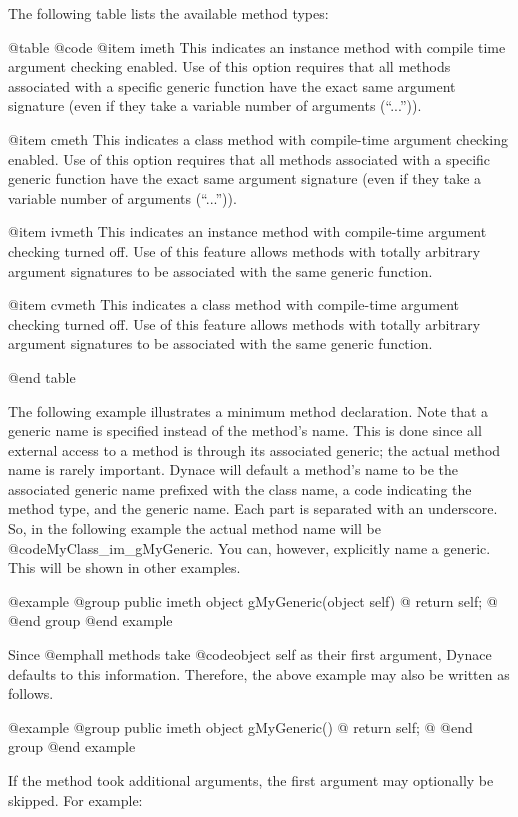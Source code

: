 The following table lists the available method types:

@table @code
@item imeth
This indicates an instance method with compile time argument checking
enabled.  Use of this option requires that all methods associated
with a specific generic function have the exact same argument
signature (even if they take a variable number of arguments (``...'')).

@item cmeth
This indicates a class method with compile-time argument checking
enabled.  Use of this option requires that all methods associated with
a specific generic function have the exact same argument signature
(even if they take a variable number of arguments (``...'')).

@item ivmeth
This indicates an instance method with compile-time argument checking
turned off.  Use of this feature allows methods with totally arbitrary
argument signatures to be associated with the same generic function.

@item cvmeth
This indicates a class method with compile-time argument checking
turned off.  Use of this feature allows methods with totally arbitrary
argument signatures to be associated with the same generic function.


@end table

The following example illustrates a minimum method declaration.  Note
that a generic name is specified instead of the method's name.  This is
done since all external access to a method is through its associated
generic; the actual method name is rarely important.  Dynace will
default a method's name to be the associated generic name prefixed with
the class name, a code indicating the method type, and the generic name.
Each part is separated with an underscore.  So, in the following example
the actual method name will be @code{MyClass_im_gMyGeneric}.  You can,
however, explicitly name a generic.  This will be shown in other
examples.

@example
@group
public  imeth   object  gMyGeneric(object self)
@{
        return self;
@}
@end group
@end example


Since @emph{all} methods take @code{object self} as their first argument,
Dynace defaults to this information.  Therefore, the above example may also
be written as follows.  


@example
@group
public  imeth   object  gMyGeneric()
@{
        return self;
@}
@end group
@end example


If the method took additional arguments, the first argument may
optionally be skipped.  For example:

